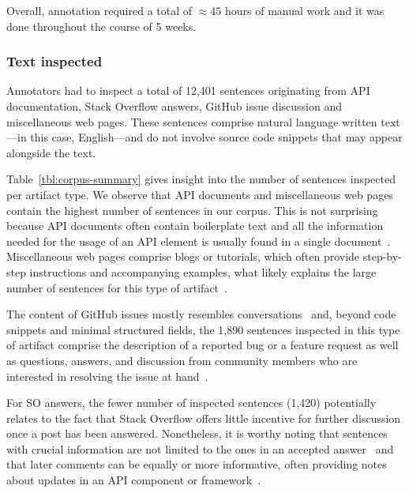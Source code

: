 Overall, annotation required a total of $\approx45$ hours of manual work and it was done throughout the course of 5 weeks.












\subsubsection{Text inspected}





Annotators had to inspect a total of 12,401 sentences originating from API documentation, Stack Overflow answers, GitHub issue discussion and miscellaneous web pages.
These sentences comprise natural language written text---in this case, English---and do not involve source code snippets that may appear alongside the text.


Table~\ref{tbl:corpus-summary} gives insight into the number of sentences inspected per artifact type. 
We observe that API documents and miscellaneous web pages contain the highest number of sentences in our corpus.
This is not surprising because API documents often contain boilerplate text 
and all the information needed for the usage of an API element is usually found in a single document~\cite{robillard2011field}.
Miscellaneous web pages comprise blogs or tutorials, 
which often provide step-by-step instructions and accompanying examples, 
what likely explains the large number of sentences for this type of artifact~\cite{arya2020, Jiang2016b}.


The content of GitHub issues mostly resembles conversations~\cite{Rastkar2010}
and, beyond code snippets and minimal structured fields, the 
1,890 sentences inspected in this type of artifact comprise the description of a reported bug or a feature request as well as questions, answers, and discussion from  community members who are interested in resolving the issue at hand~\cite{zimmermann2010}.



For SO answers, the fewer number of inspected sentences (1,420) potentially relates to 
the fact that Stack Overflow offers little incentive for further discussion once a post has been answered.
Nonetheless, it is worthy noting that sentences with crucial information 
are not limited to the ones in an accepted answer~\cite{nadi2020}
and that later comments can be equally or more informative,
often providing notes about updates in an API component or framework~\cite{zhang2019so}.





